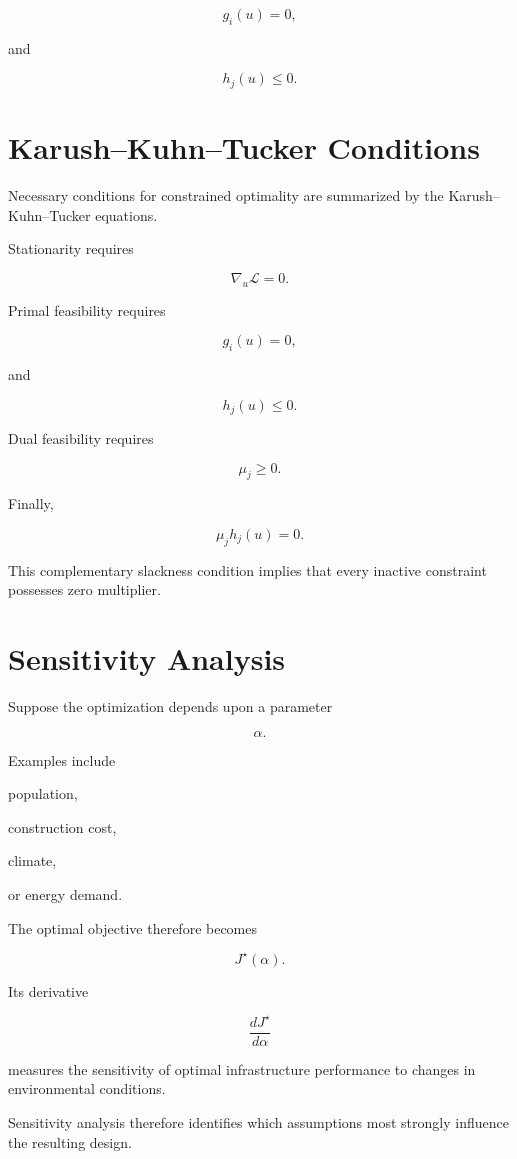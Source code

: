 \documentclass[11pt,fleqn]{book}
\numberwithin{equation}{chapter}
\theoremstyle{plain}
\theoremstyle{definition}
\theoremstyle{remark}
\begin{document}
\[
g_i(u)=0,
\]

and

\[
h_j(u)\le0.
\]


\section{Karush--Kuhn--Tucker Conditions}

Necessary conditions for constrained optimality are summarized by the
Karush--Kuhn--Tucker equations.

Stationarity requires

\[
\nabla_u
\mathcal L
=
0.
\]

Primal feasibility requires

\[
g_i(u)=0,
\]

and

\[
h_j(u)\le0.
\]

Dual feasibility requires

\[
\mu_j\ge0.
\]

Finally,

\[
\boxed{
\mu_jh_j(u)=0.
}
\]

This complementary slackness condition implies that every inactive
constraint possesses zero multiplier.


\section{Sensitivity Analysis}

Suppose the optimization depends upon a parameter

\[
\alpha.
\]

Examples include

population,

construction cost,

climate,

or energy demand.

The optimal objective therefore becomes

\[
J^\star(\alpha).
\]

Its derivative

\[
\frac{dJ^\star}{d\alpha}
\]

measures the sensitivity of optimal infrastructure performance to
changes in environmental conditions.

Sensitivity analysis therefore identifies which assumptions most
strongly influence the resulting design.
\end{document}
